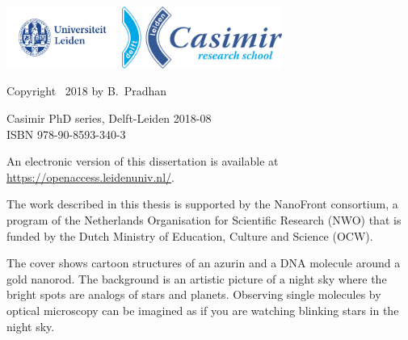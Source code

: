 \begin{titlepage}
\vfill
\begin{center}
    \includegraphics[height=0.8in]{frontback/logos/leiden}
    \hspace{2em}
    \includegraphics[height=0.8in]{frontback/logos/casimir} \\
\end{center}
\vfill

\vspace{2\bigskipamount}

\noindent Copyright \textcopyright\ 2018 by B.~Pradhan


\medskip
\noindent Casimir PhD series, Delft-Leiden 2018-08 \\
\noindent ISBN 978-90-8593-340-3

\medskip
\noindent An electronic version of this dissertation is available at \\
\url{https://openaccess.leidenuniv.nl/}.

\medskip
\noindent The work described in this thesis is supported by the NanoFront consortium, a program of the Netherlands Organisation for Scientific Research (NWO) that is funded by the Dutch Ministry of Education, Culture and Science (OCW).

\medskip
\noindent The cover shows cartoon structures of an azurin and a DNA molecule around a gold nanorod. The background is an artistic picture of a night sky where the bright spots are analogs of stars and planets. Observing single molecules by optical microscopy can be imagined as if you are watching blinking stars in the night sky.  

\end{titlepage}

